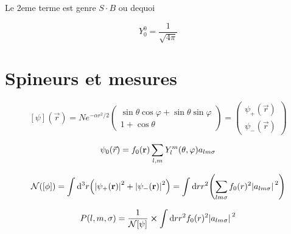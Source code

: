 \documentclass{article}
\begin{document}
Le 2eme terme est genre $S\cdot B$ ou dequoi

$$\boxed{Y_0^0 = \frac{1}{\sqrt{4\pi}}}$$


\section{Spineurs et mesures}

$$[\psi](\vec r) = Ne^{-\alpha r^2/2}\begin{pmatrix}\sin\theta\cos\varphi + \sin\theta\sin\varphi\\ 1+\cos\theta\end{pmatrix} = \begin{pmatrix}
	\psi_+(\vec r)\\\psi_-(\vec r)
\end{pmatrix}$$

$$\psi_0(\vec r) = f_0(\vb r) \sum_{l,m} Y_l^m(\theta, \varphi)a_{lm\sigma}$$

$$\mathcal{N}([\phi]) = \int \dd^3 r \qty(\abs{\psi_+(\vb r)}^2 + \abs{\psi_-(\vb r)}^2) = \int \dd r r^2\qty(\sum_{lm\sigma}f_0(r)^2\abs*{a_{lm\sigma}}^2)$$


$$P(l,m,\sigma) = \frac{1}{\mathcal{N}[\psi]}\cross \int\dd r r^2 f_0(r)^2\abs*{a_{lm\sigma}}^2$$
\end{document}
